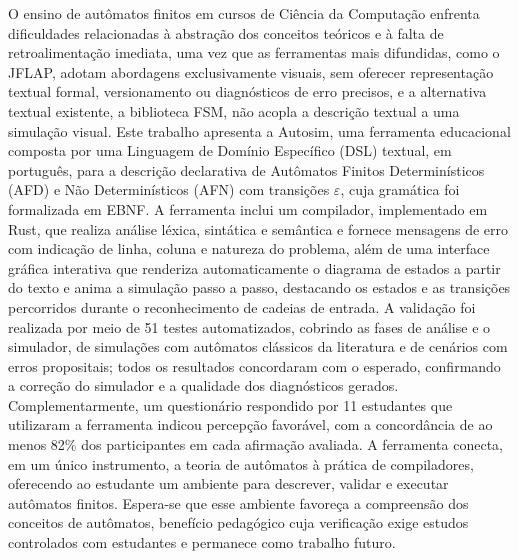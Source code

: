 \documentclass[
    12pt
    ,oneside
    ,a4paper
    ,chapter=TITLE
    ,section=TITLE
    ,sumario=abnt-6027-2012]{abntex2}
\begin{document}
\begin{resumo}
    O ensino de autômatos finitos em cursos de Ciência da Computação enfrenta dificuldades
    relacionadas à abstração dos conceitos teóricos e à falta de retroalimentação imediata,
    uma vez que as ferramentas mais difundidas, como o JFLAP, adotam abordagens exclusivamente
    visuais, sem oferecer representação textual formal, versionamento ou diagnósticos de erro
    precisos, e a alternativa textual existente, a biblioteca FSM, não acopla a descrição
    textual a uma simulação visual. Este trabalho
    apresenta a Autosim, uma ferramenta educacional composta por uma Linguagem de Domínio
    Específico (DSL) textual, em português, para a descrição declarativa de Autômatos Finitos
    Determinísticos (AFD) e Não Determinísticos (AFN) com transições $\varepsilon$, cuja
    gramática foi formalizada em EBNF. A ferramenta inclui um compilador, implementado em Rust,
    que realiza análise léxica, sintática e semântica e fornece mensagens de erro com indicação
    de linha, coluna e natureza do problema, além de uma interface gráfica interativa que
    renderiza automaticamente o diagrama de estados a partir do texto e anima a simulação passo
    a passo, destacando os estados e as transições percorridos durante o reconhecimento de
    cadeias de entrada. A validação foi realizada por meio de 51 testes automatizados, cobrindo
    as fases de análise e o simulador, de simulações com autômatos clássicos da literatura e de
    cenários com erros propositais; todos os resultados concordaram com o esperado, confirmando
    a correção do simulador e a qualidade dos diagnósticos gerados. Complementarmente, um
    questionário respondido por 11 estudantes que utilizaram a ferramenta indicou percepção
    favorável, com a concordância de ao menos 82\% dos participantes em cada afirmação avaliada.
    A ferramenta conecta, em um
    único instrumento, a teoria de autômatos à prática de compiladores, oferecendo ao estudante
    um ambiente para descrever, validar e executar autômatos finitos. Espera-se que esse
    ambiente favoreça a compreensão dos conceitos de autômatos, benefício pedagógico cuja
    verificação exige estudos controlados com estudantes e permanece como trabalho futuro.

\end{resumo}


\listadefiguras
\listadequadros
\end{document}
